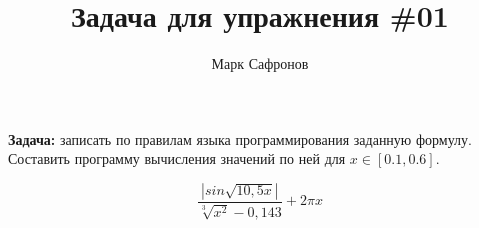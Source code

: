 \documentclass{article}
\title{Задача для упражнения \#01}
\author{Марк Сафронов}
\begin{document}
\maketitle

\textbf{Задача:} записать по правилам языка программирования заданную формулу.
Составить программу вычисления значений по ней для $x \in [0.1, 0.6]$.

\begin{equation}
\frac{ |sin\sqrt{10,5x}| }{\sqrt[3]{x^2} - 0,143} + 2\pi x
\end{equation}
\end{document}
